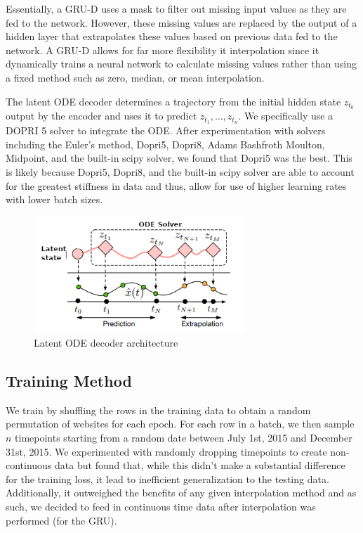 \documentclass{article} %
\begin{document}
Essentially, a GRU-D uses a mask to filter out missing input values as they are fed to the network. However, these missing values are replaced by the output of a hidden layer that extrapolates these values based on previous data fed to the network. A GRU-D allows for far more flexibility it interpolation since it dynamically trains a neural network to calculate missing values rather than using a fixed method such as zero, median, or mean interpolation.

The latent ODE decoder determines a trajectory from the initial hidden state $z_{t_0}$ output by the encoder and uses it to predict $z_{t_1}, \ldots, z_{t_n}$. 
We specifically use a DOPRI 5 solver to integrate the ODE. After experimentation with solvers including the Euler's method, Dopri5, Dopri8, Adams Bashfroth Moulton, Midpoint, and the built-in scipy solver, we found that Dopri5 was the best. This is likely because Dopri5, Dopri8, and the built-in scipy solver are able to account for the greatest stiffness in data and thus, allow for use of higher learning rates with lower batch sizes.
\begin{figure}[h]
  \centering
  \includegraphics[width=8cm]{decoder.png}
  \caption{Latent ODE decoder architecture}
\end{figure}

\subsection{Training Method}

We train by shuffling the rows in the training data to obtain a random permutation of websites for each epoch. For each row in a batch, we then sample $n$ timepoints starting from a random date between July 1st, 2015 and December 31st, 2015. We experimented with randomly dropping timepoints to create non-continuous data but found that, while this didn't make a substantial difference for the training loss, it lead to inefficient generalization to the testing data. Additionally, it outweighed the benefits of any given interpolation method and as such, we decided to feed in continuous time data after interpolation was performed (for the GRU).
\end{document}
